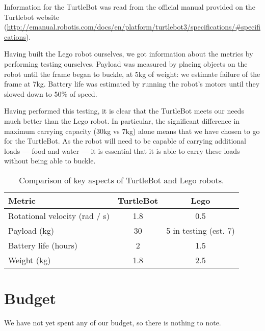 \documentclass{article}
\begin{document}
Information for the TurtleBot was read from the official manual provided on the Turtlebot website (\url{http://emanual.robotis.com/docs/en/platform/turtlebot3/specifications/\#specifications}).

Having built the Lego robot ourselves, we got information about the metrics by performing testing ourselves. Payload was measured by placing objects on the robot until the frame began to buckle, at 5kg of weight: we estimate failure of the frame at 7kg. Battery life was estimated by running the robot's motors until they slowed down to 50\% of speed. 

Having performed this testing, it is clear that the TurtleBot meets our needs much better than the Lego robot. In particular, the significant difference in maximum carrying capacity (30kg vs 7kg) alone means that we have chosen to go for the TurtleBot. As the robot will need to be capable of carrying additional loads --- food and water --- it is essential that it is able to carry these loads without being able to buckle.


\begin{table}[h]
\vskip 3mm
\begin{center}
\begin{small}
\begin{sc}
\begin{tabular}{lcc}
\hline
\abovespace\belowspace
Metric & TurtleBot & Lego \\
\hline
  Rotational velocity (rad / s) & 1.8 & 0.5 \\
  Payload (kg) & 30 & 5 in testing (est. 7) \\
  Battery life (hours) & 2 & 1.5 \\
  Weight (kg) & 1.8 & 2.5 
\end{tabular}
\end{sc}
\end{small}
\caption{Comparison of key aspects of TurtleBot and Lego robots.}
\label{tab:sample-table}
\end{center}
\vskip -3mm
\end{table}


\section{Budget}
We have not yet spent any of our budget, so there is nothing to note. 



\end{document}
